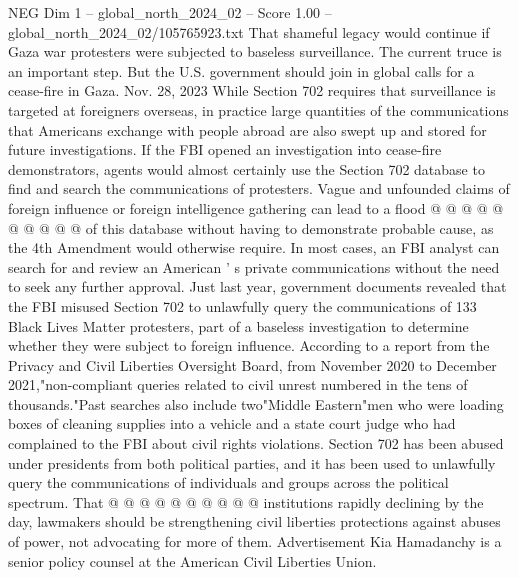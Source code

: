 \begin{textsample}{NEG Dim 1 – global\_north\_2024\_02 – Score 1.00 – global\_north\_2024\_02/105765923.txt}
That shameful legacy would continue if Gaza war protesters were subjected to baseless surveillance.
The current truce is an important step.
But the U.S. government should join in global calls for a cease-fire in Gaza.
Nov. 28, 2023 While Section 702 requires that surveillance is targeted at foreigners overseas, in practice large quantities of the communications that Americans exchange with people abroad are also swept up and stored for future investigations.
If the FBI opened an investigation into cease-fire demonstrators, agents would almost certainly use the Section 702 database to find and search the communications of protesters.
Vague and unfounded claims of foreign influence or foreign intelligence gathering can lead to a flood @ @ @ @ @ @ @ @ @ @ of this database without having to demonstrate probable cause, as the 4th Amendment would otherwise require.
In most cases, an FBI analyst can search for and review an American ' s private communications without the need to seek any further approval.
Just last year, government documents revealed that the FBI misused Section 702 to unlawfully query the communications of 133 Black Lives Matter protesters, part of a baseless investigation to determine whether they were subject to foreign influence.
According to a report from the Privacy and Civil Liberties Oversight Board, from November 2020 to December 2021,"non-compliant queries related to civil unrest numbered in the tens of thousands."Past searches also include two"Middle Eastern"men who were loading boxes of cleaning supplies into a vehicle and a state court judge who had complained to the FBI about civil rights violations.
Section 702 has been abused under presidents from both political parties, and it has been used to unlawfully query the communications of individuals and groups across the political spectrum.
That @ @ @ @ @ @ @ @ @ @ institutions rapidly declining by the day, lawmakers should be strengthening civil liberties protections against abuses of power, not advocating for more of them.
Advertisement Kia Hamadanchy is a senior policy counsel at the American Civil Liberties Union.

\end{textsample}
